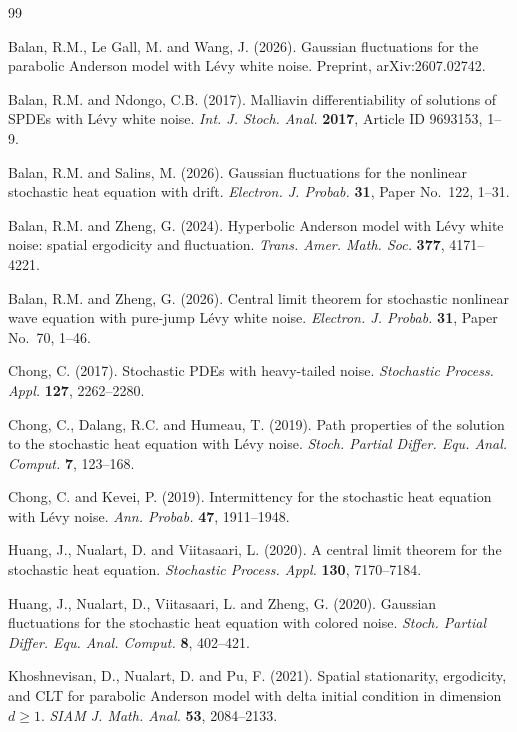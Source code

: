 \documentclass[12pt]{article}
\begin{document}
\begin{thebibliography}{99}

Balan, R.M., Le Gall, M. and Wang, J. (2026).
Gaussian fluctuations for the parabolic Anderson model with L\'evy white noise.
Preprint, arXiv:2607.02742.

Balan, R.M. and Ndongo, C.B. (2017).
Malliavin differentiability of solutions of SPDEs with L\'evy white noise.
{\em Int. J. Stoch. Anal.}
{\bf 2017}, Article ID 9693153, 1--9.

Balan, R.M. and Salins, M. (2026).
Gaussian fluctuations for the nonlinear stochastic heat equation with drift.
{\em Electron. J. Probab.}
{\bf 31}, Paper No.~122, 1--31.

Balan, R.M. and Zheng, G. (2024).
Hyperbolic Anderson model with L\'evy white noise:
spatial ergodicity and fluctuation.
{\em Trans. Amer. Math. Soc.}
{\bf 377}, 4171--4221.

Balan, R.M. and Zheng, G. (2026).
Central limit theorem for stochastic nonlinear wave equation
with pure-jump L\'evy white noise.
{\em Electron. J. Probab.}
{\bf 31}, Paper No.~70, 1--46.

Chong, C. (2017).
Stochastic PDEs with heavy-tailed noise.
{\em Stochastic Process. Appl.}
{\bf 127}, 2262--2280.

Chong, C., Dalang, R.C. and Humeau, T. (2019).
Path properties of the solution to the stochastic heat equation with L\'evy
noise.
{\em Stoch. Partial Differ. Equ. Anal. Comput.}
{\bf 7}, 123--168.

Chong, C. and Kevei, P. (2019).
Intermittency for the stochastic heat equation with L\'evy noise.
{\em Ann. Probab.}
{\bf 47}, 1911--1948.

Huang, J., Nualart, D. and Viitasaari, L. (2020).
A central limit theorem for the stochastic heat equation.
{\em Stochastic Process. Appl.}
{\bf 130}, 7170--7184.

Huang, J., Nualart, D., Viitasaari, L. and Zheng, G. (2020).
Gaussian fluctuations for the stochastic heat equation with colored noise.
{\em Stoch. Partial Differ. Equ. Anal. Comput.}
{\bf 8}, 402--421.

Khoshnevisan, D., Nualart, D. and Pu, F. (2021).
Spatial stationarity, ergodicity, and CLT for parabolic Anderson model
with delta initial condition in dimension $d\geq 1$.
{\em SIAM J. Math. Anal.}
{\bf 53}, 2084--2133.


\end{thebibliography}
\end{document}
